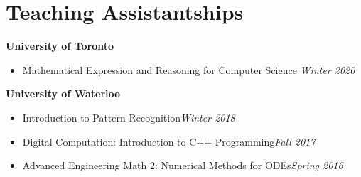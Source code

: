 \section*{Teaching Assistantships}
    \vspace{\postsubhead}
    \textbf{University of Toronto}
      \begin{itemize}
        \setlength\itemsep{0.2em}
        \item Mathematical Expression and Reasoning for Computer Science
          \hfill
      	 \textit{Winter 2020}
      \end{itemize}
    \vspace{\interlist}
    \textbf{University of Waterloo}
      \begin{itemize}
        \setlength\itemsep{0.2em}
        \item Introduction to Pattern Recognition\hfill\textit{Winter 2018}
        \item Digital Computation: Introduction to C++ Programming\hfill\textit{Fall 2017}
        \item Advanced Engineering Math 2: Numerical Methods for ODEs\hfill\textit{Spring 2016}
      \end{itemize}
   \vspace{\interlist}